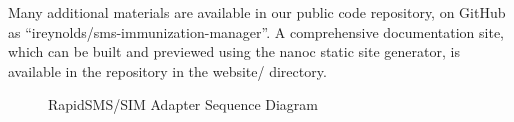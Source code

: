 \documentclass{acm_proc_article-sp}
\begin{document}

  
\balancecolumns

\appendix
Many additional materials are available in our public code repository, on GitHub as ``ireynolds/sms-immunization-manager''. A comprehensive documentation site, which can be built and previewed using the nanoc static site generator, is available in the repository in the website/ directory.

\begin{figure*}
\centering
{}
\caption{RapidSMS/SIM Adapter Sequence Diagram}
\end{figure*}
\end{document}
